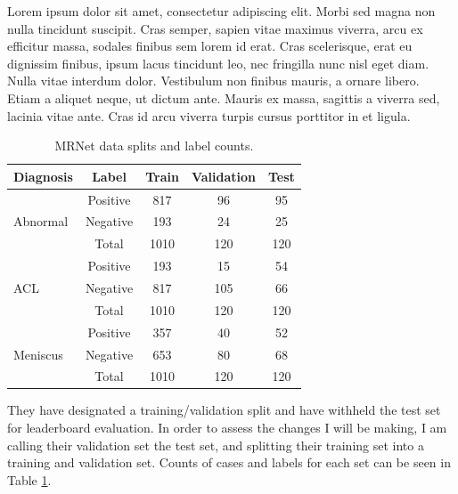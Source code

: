\documentclass[10pt,twocolumn,letterpaper]{article}
\begin{document}
Lorem ipsum dolor sit amet, consectetur adipiscing elit. Morbi sed magna non nulla tincidunt suscipit. Cras semper, sapien vitae maximus viverra, arcu ex efficitur massa, sodales finibus sem lorem id erat. Cras scelerisque, erat eu dignissim finibus, ipsum lacus tincidunt leo, nec fringilla nunc nisl eget diam. Nulla vitae interdum dolor. Vestibulum non finibus mauris, a ornare libero. Etiam a aliquet neque, ut dictum ante. Mauris ex massa, sagittis a viverra sed, lacinia vitae ante. Cras id arcu viverra turpis cursus porttitor in et ligula.

\begin{table}
\begin{center}
\begin{tabular}{|lc|c|c|c|}
\hline
Diagnosis & Label & Train & Validation & Test \\
\hline\hline
\multirow{ 3}{*}{Abnormal} & Positive & 817 & 96 & 95 \\
                           & Negative & 193 & 24 & 25 \\
                           & Total & 1010 & 120 & 120 \\
\hline
\multirow{ 3}{*}{ACL}      & Positive & 193 & 15 & 54 \\
                           & Negative & 817 & 105 & 66 \\
                           & Total & 1010 & 120 & 120 \\
\hline
\multirow{ 3}{*}{Meniscus} & Positive & 357 & 40 & 52 \\
                           & Negative & 653 & 80 & 68 \\
                           & Total & 1010 & 120 & 120 \\
\hline
\end{tabular}
\end{center}
\caption{MRNet data splits and label counts.}
\label{tab:dataset}
\end{table}


They have designated a training/validation split and have withheld the test set for leaderboard evaluation. In order to assess the changes I will be making, I am calling their validation set the test set, and splitting their training set into a training and validation set. Counts of cases and labels for each set can be seen in Table \ref{tab:dataset}.
\end{document}

